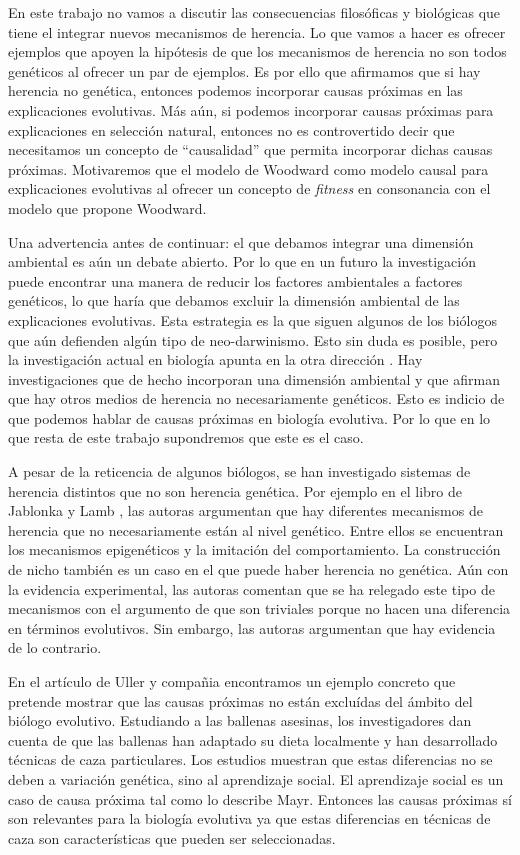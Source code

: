 En este trabajo no vamos a discutir las consecuencias filosóficas y biológicas que tiene el integrar nuevos mecanismos de herencia. Lo que vamos a hacer es ofrecer ejemplos que apoyen la hipótesis de que los mecanismos de herencia no son todos genéticos al ofrecer un par de ejemplos. Es por ello que afirmamos que si hay herencia no genética, entonces podemos incorporar causas próximas en las explicaciones evolutivas. Más aún, si podemos incorporar causas próximas para explicaciones en selección natural, entonces no es controvertido decir que necesitamos un concepto de ``causalidad'' que permita incorporar dichas causas próximas. Motivaremos que el modelo de Woodward como modelo causal para explicaciones evolutivas al ofrecer un concepto de \emph{fitness} en consonancia con el modelo que propone Woodward.

Una advertencia antes de continuar: el que debamos integrar una dimensión ambiental es aún un debate abierto. Por lo que en un futuro la investigación puede encontrar una manera de reducir los factores ambientales a factores genéticos, lo que haría que debamos excluir la dimensión ambiental de las explicaciones evolutivas. Esta estrategia es la que siguen algunos de los biólogos que aún defienden algún tipo de neo-darwinismo. Esto sin duda es posible, pero la investigación actual en biología apunta en la otra dirección  \cite{Bateson2014}. Hay investigaciones que de hecho incorporan una dimensión ambiental y que afirman que hay otros medios de herencia no necesariamente genéticos. Esto es indicio de que podemos hablar de causas próximas en biología evolutiva. Por lo que en lo que resta de este trabajo supondremos que este es el caso.

A pesar de la reticencia de algunos biólogos, se han investigado sistemas de herencia distintos que no son herencia genética. Por ejemplo en el libro de Jablonka y Lamb \citeyear{Jablonka2020}, las autoras argumentan que hay diferentes mecanismos de herencia que no necesariamente están al nivel genético. Entre ellos se encuentran los mecanismos epigenéticos y la imitación del comportamiento. La construcción de nicho también es un caso en el que puede haber herencia no genética. Aún con la evidencia experimental, las autoras comentan que se ha relegado este tipo de mecanismos con el argumento de que son triviales porque no hacen una diferencia en términos evolutivos. Sin embargo, las autoras argumentan que hay evidencia de lo contrario.

En el artículo de Uller y compañia \citeyear{Uller2019} encontramos un ejemplo concreto que pretende mostrar que las causas próximas no están excluídas del ámbito del biólogo evolutivo. Estudiando a las ballenas asesinas, los investigadores dan cuenta de que las ballenas han adaptado su dieta localmente y han desarrollado técnicas de caza particulares. Los estudios muestran que estas diferencias no se deben a variación genética, sino al aprendizaje social. El aprendizaje social es un caso de causa próxima tal como lo describe Mayr. Entonces las causas próximas sí son relevantes para la biología evolutiva ya que estas diferencias en técnicas de caza son características que pueden ser seleccionadas.

